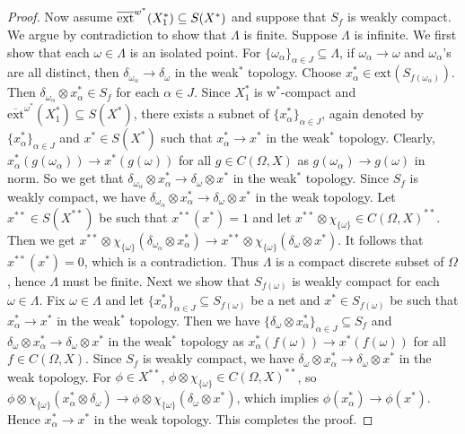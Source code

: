 \documentclass[12pt]{amsart}
\theoremstyle{definition}
\numberwithin{equation}{section}
\begin{document}
\begin{proof}
    Now assume $\overline{\textnormal{ext}}^{w^*}{(X_{1}^*)}\subseteq S(X^*)$ and suppose that $ S_f $ is weakly compact. We argue by contradiction to show that $ \Lambda $ is finite. Suppose $ \Lambda $ is infinite. We first show that each $ \omega \in \Lambda $ is an isolated point. For $ \{\omega_\alpha\}_{\alpha\in J}\subseteq\Lambda $, if $ \omega_\alpha \to \omega $ and $ \omega_\alpha $'s are all distinct, then $\delta_{\omega_\alpha} \to \delta_{\omega}$ in the weak$^*$ topology. Choose $x_{\alpha}^*\in \text{ext}(S_{f(\omega_{\alpha})})$. Then $\delta_{\omega_{\alpha}}\otimes x_{\alpha}^*\in S_{f}$ for each $\alpha\in J$. Since $X_{1}^*$  is w$^*$-compact and $\overline{\text{ext}}^{\omega^*}{(X_{1}^*)}\subseteq S(X^*)$, there exists a subnet of $\{x_{\alpha}^*\}_{\alpha \in J}$, again denoted by $\{x_{\alpha}^*\}_{\alpha \in J}$ and $x^*\in S(X^*)$ such that $x_{\alpha}^*\to x^*$ in the weak$^*$ topology. Clearly, $x_{\alpha}^*(g(\omega_{\alpha}))\to x^*(g(\omega))$ for all $g\in C(\Omega,X)$ as $g(\omega_\alpha)\to g(\omega)$ in norm. So we get that $\delta_{\omega_{\alpha}}\otimes x_{\alpha}^*\to \delta_{\omega}\otimes x^*$ in the weak$^*$ topology. Since $S_f$ is weakly compact, we have $\delta_{\omega_{\alpha}}\otimes x_{\alpha}^*\to \delta{_\omega}\otimes x^*$ in the weak topology. Let $x^{**}\in S(X^{**})$ be such that $x^{**}(x^*)=1$ and let $x^{**}\otimes\chi_{\{\omega\}} \in C(\Omega,X)^{**}$. Then we get $x^{**}\otimes\chi_{\{\omega\}}\left( \delta_{\omega_{\alpha}}\otimes x_{\alpha}^*\right) \to x^{**}\otimes\chi_{\{\omega\}}\left( \delta_{\omega}\otimes x^*\right)$. It follows that $x^{**}(x^*)=0$, which is a contradiction. Thus $\Lambda$ is a compact discrete subset of $\Omega$, hence $ \Lambda $ must be finite. Next we show that $S_{f(\omega)}$ is weakly compact for each $\omega\in \Lambda$. Fix $\omega\in \Lambda$ and let $\{x_{\alpha}^*\}_{\alpha\in J}\subseteq S_{f(\omega)}$ be a net and $x^*\in S_{f(\omega)}$ be such that $x_{\alpha}^*\to x^*$ in the weak$^*$ topology. Then we have $\{\delta_{\omega}\otimes x_{\alpha}^*\}_{\alpha\in J}\subseteq S_{f}$ and $\delta_{\omega}\otimes x_{\alpha}^*\to\delta_{\omega}\otimes x^*$ in the weak$^*$ topology as $x_{\alpha}^*(f(\omega))\to x^*(f(\omega))$ for all $f\in C(\Omega,X)$. Since $S_{f}$ is weakly compact, we have $\delta_{\omega}\otimes x_{\alpha}^*\to\delta_{\omega}\otimes x^*$ in the weak topology. For $\phi\in X^{**}$, $\phi\otimes\chi_{\{\omega\}}\in C(\Omega,X)^{**}$, so $\phi\otimes\chi_{\{\omega\}}\left( x_{\alpha}^*\otimes\delta_{\omega}\right) \to \phi\otimes\chi_{\{\omega\}}\left( \delta_{\omega}\otimes x^*\right)$, which implies $\phi(x_{\alpha}^*)\to \phi(x^*)$. Hence $x_{\alpha}^*\to x^*$ in the weak topology. This completes the proof.
 \end{proof}
\end{document}
